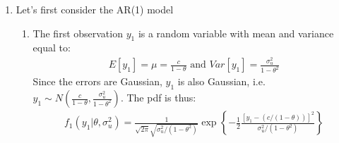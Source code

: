 \begin{enumerate}
\item Let's first consider the AR(1) model
	\begin{enumerate}
		\item The first observation \(y_1\) is a random variable with mean and variance equal to:
		\begin{align*}
		E[y_1] = \mu = \frac{c}{1-\theta} \text{ and } Var[y_1] = \frac{\sigma_u^2}{1-\theta^2}
		\end{align*}
		Since the errors are Gaussian, $y_1$ is also Gaussian, i.e. $y_1 \sim N\left(\frac{c}{1-\theta},\frac{\sigma_u^2}{1-\theta^2}\right)$.
		The pdf is thus:
		\begin{align*}
        f_1(y_1|\theta,\sigma_u^2) = \frac{1}{\sqrt{2\pi}\sqrt{\sigma_u^2/(1-\theta^2)}}\exp\left\{-\frac{1}{2}\frac{[y_1-(c/(1-\theta))]^2}{\sigma_u^2/(1-\theta^2)}\right\}
        \end{align*}	
		

\end{enumerate}
\end{enumerate}
